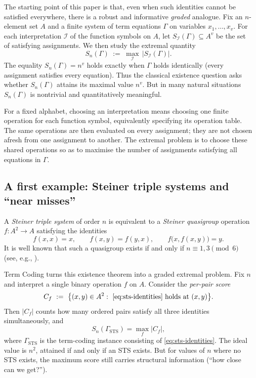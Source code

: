 \documentclass[11pt]{article}
\theoremstyle{plain}
\theoremstyle{definition}
\theoremstyle{definition}
\theoremstyle{remark}
\newcommand{\A}{A}
\newcommand{\Sn}{S_n}
\newcommand{\SI}{S_{\mathcal I}}
\newcommand{\abs}[1]{\left\lvert #1 \right\rvert}
\begin{document}
The starting point of this paper is that, even when such identities cannot be satisfied everywhere,
there is a robust and informative \emph{graded} analogue.
Fix an $n$-element set $\A$ and a finite system of term equations $\Gamma$ on variables
$x_1,\dots,x_v$.
For each interpretation $\mathcal I$ of the function symbols on $\A$, let $\SI(\Gamma)\subseteq \A^v$
be the set of satisfying assignments. We then study the extremal quantity
\[
\Sn(\Gamma)\;:=\;\max_{\mathcal I}\,\abs{\SI(\Gamma)}.
\]
The equality $\Sn(\Gamma)=n^v$ holds exactly when $\Gamma$ holds identically (every assignment
satisfies every equation). Thus the classical existence question asks whether $\Sn(\Gamma)$
attains its maximal value $n^v$.
But in many natural situations $\Sn(\Gamma)$ is nontrivial and quantitatively meaningful.

For a fixed alphabet, choosing an interpretation means choosing one finite operation for each
function symbol, equivalently specifying its operation table. The same operations are then
evaluated on every assignment; they are not chosen afresh from one assignment to another.
The extremal problem is to choose these shared operations so as to maximise the number of
assignments satisfying all equations in $\Gamma$.

\subsection{A first example: Steiner triple systems and ``near misses''}
\label{subsec:sts-example}

A \emph{Steiner triple system} of order $n$ is equivalent to a \emph{Steiner quasigroup} operation
$f:\A^2\to\A$ satisfying the identities
\begin{equation}
\label{eq:sts-identities}
  f(x,x)=x,\qquad f(x,y)=f(y,x),\qquad f\bigl(x,f(x,y)\bigr)=y.
\end{equation}
It is well known that such a quasigroup exists if and only if $n\equiv 1,3\pmod 6$
(see, e.g., \cite[Ch.~19]{lintwilson2001course}).

Term Coding turns this existence theorem into a graded extremal problem.
Fix $n$ and interpret a single binary operation $f$ on $\A$.
Consider the \emph{per-pair score}
\[
  C_f\ :=\ \bigl\{(x,y)\in \A^2:\ \eqref{eq:sts-identities}\ \text{holds at }(x,y)\bigr\}.
\]
Then $\abs{C_f}$ counts how many ordered pairs satisfy all three identities simultaneously,
and
\[
  \Sn(\Gamma_{\mathrm{STS}})=\max_f\abs{C_f},
\]
where $\Gamma_{\mathrm{STS}}$ is the term-coding instance consisting of \eqref{eq:sts-identities}.
The ideal value is $n^2$, attained if and only if an STS exists.
But for values of $n$ where no STS exists, the maximum score still carries structural information
(``how close can we get?'').
\end{document}
